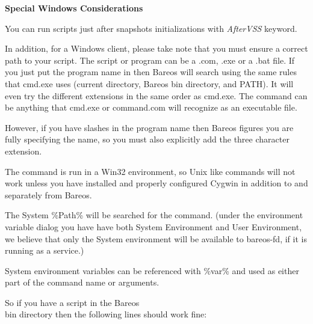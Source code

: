 {{\bf Special Windows Considerations}

You can run scripts just after snapshots initializations with
\textsl{AfterVSS} keyword.

In addition, for a Windows client, please take
note that you must ensure a correct path to your script.  The script or
program can be a .com, .exe or a .bat file.  If you just put the program
name in then Bareos will search using the same rules that cmd.exe uses
(current directory, Bareos bin directory, and PATH).  It will even try the
different extensions in the same order as cmd.exe.
The command can be anything that cmd.exe or command.com will recognize
as an executable file.

However, if you have slashes in the program name then Bareos figures you
are fully specifying the name, so you must also explicitly add the three
character extension.

The command is run in a Win32 environment, so Unix like commands will not
work unless you have installed and properly configured Cygwin in addition
to and separately from Bareos.

The System \%Path\% will be searched for the command.  (under the
environment variable dialog you have have both System Environment and
User Environment, we believe that only the System environment will be
available to bareos-fd, if it is running as a service.)

System environment variables can be referenced with \%var\% and
used as either part of the command name or arguments.

So if you have a script in the Bareos\\bin directory then the following lines
should work fine:



}
